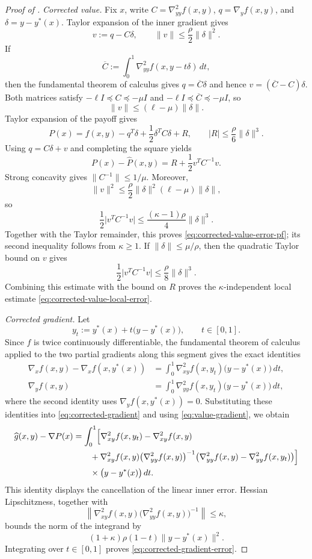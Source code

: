 \documentclass{article}
\begin{document}
\begin{proof}[Proof of ]
\smallskip\noindent\emph{Corrected value.}
Fix $x$, write $C=\nabla^2_{yy}f(x,y)$,
$q=\nabla_yf(x,y)$, and $\delta=y-y^*(x)$.  Taylor expansion of the
inner gradient gives
\[
 v:=q-C\delta,
 \qquad
 \|v\|\le\frac\rho2\|\delta\|^2.
\]
If
\[
 \overline C:=\int_0^1\nabla^2_{yy}f(x,y-t\delta)\,dt,
\]
then the fundamental theorem of calculus gives
$q=\overline C\delta$ and hence
$v=(\overline C-C)\delta$.  Both matrices satisfy
$-\ell I\preceq C\preceq-\mu I$ and
$-\ell I\preceq\overline C\preceq-\mu I$, so
\[
 \|v\|\le(\ell-\mu)\|\delta\|.
\]
Taylor expansion of the payoff gives
\[
 P(x)=f(x,y)-q^T\delta+\frac12\delta^TC\delta+R,
 \qquad |R|\le\frac\rho6\|\delta\|^3.
\]
Using $q=C\delta+v$ and completing the square yields
\[
 P(x)-\widehat P(x,y)=R+\frac12v^TC^{-1}v.
\]
Strong concavity gives $\|C^{-1}\|\le1/\mu$.  Moreover,
\[
 \|v\|^2
 \le\frac\rho2\|\delta\|^2
       (\ell-\mu)\|\delta\|,
\]
so
\[
 \frac12\bigl|v^TC^{-1}v\bigr|
 \le\frac{(\kappa-1)\rho}{4}\|\delta\|^3.
\]
Together with the Taylor remainder, this proves
\eqref{eq:corrected-value-error-pf}; its second inequality follows from
$\kappa\ge1$.  If $\|\delta\|\le\mu/\rho$, then the quadratic
Taylor bound on $v$ gives
\[
 \frac12\bigl|v^TC^{-1}v\bigr|
 \le\frac{\rho}{8}\|\delta\|^3.
\]
Combining this estimate with the bound on $R$ proves the
$\kappa$-independent local estimate
\eqref{eq:corrected-value-local-error}.

\smallskip\noindent\emph{Corrected gradient.}
Let
\[
 y_t:=y^*(x)+t\bigl(y-y^*(x)\bigr),
 \qquad t\in[0,1].
\]
Since $f$ is twice continuously differentiable, the fundamental theorem
of calculus applied to the two partial gradients along this segment
gives the exact identities
\begin{align*}
 \nabla_xf(x,y)-\nabla_xf(x,y^*(x))
 &=\int_0^1\nabla^2_{xy}f(x,y_t)
       \bigl(y-y^*(x)\bigr)\,dt,\\
 \nabla_yf(x,y)
 &=\int_0^1\nabla^2_{yy}f(x,y_t)
       \bigl(y-y^*(x)\bigr)\,dt,
\end{align*}
where the second identity uses $\nabla_yf(x,y^*(x))=0$.
Substituting these identities into \eqref{eq:corrected-gradient} and
using \eqref{eq:value-gradient}, we obtain
\begin{align*}
 \widehat g(x,y)-\nabla P(x)
 &=\int_0^1\Bigl[
   \nabla^2_{xy}f(x,y_t)-\nabla^2_{xy}f(x,y)\\
 &\qquad
   +\nabla^2_{xy}f(x,y)
    \bigl(\nabla^2_{yy}f(x,y)\bigr)^{-1}
    \bigl(
      \nabla^2_{yy}f(x,y)-\nabla^2_{yy}f(x,y_t)
    \bigr)
  \Bigr]\\
 &\qquad {}\times\bigl(y-y^*(x)\bigr)\,dt.
\end{align*}
This identity displays the cancellation of the linear inner error.
Hessian Lipschitzness, together with
\[
 \left\|\nabla^2_{xy}f(x,y)
   \bigl(\nabla^2_{yy}f(x,y)\bigr)^{-1}\right\|\le\kappa,
\]
bounds the norm of the integrand by
\[
 (1+\kappa)\rho(1-t)\|y-y^*(x)\|^2.
\]
Integrating over $t\in[0,1]$ proves
\eqref{eq:corrected-gradient-error}.


\end{proof}
\end{document}
